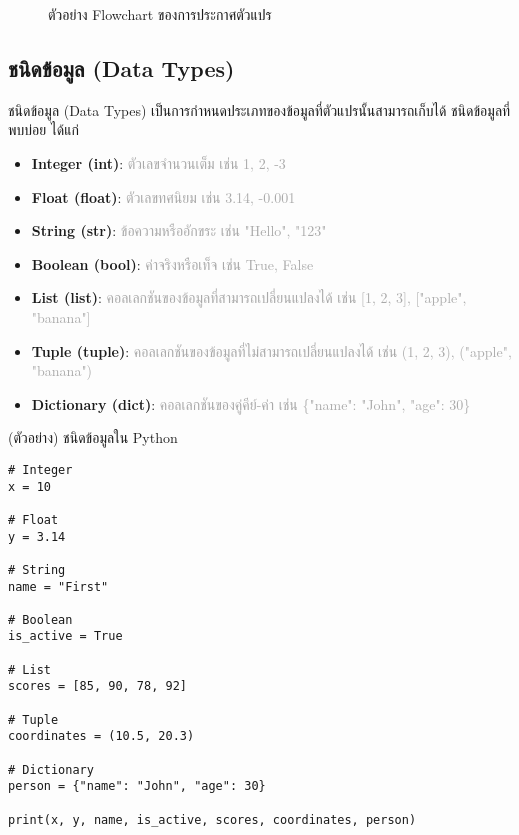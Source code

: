 \documentclass[12pt,a4paper]{article}
\newcommand{\textlight}[1]{{\thailightfont #1}}
\begin{document}
\vspace{0.1cm}

\begin{figure}[H]
\centering
{}
\caption{ตัวอย่าง Flowchart ของการประกาศตัวแปร}
\end{figure}

\subsection{ชนิดข้อมูล (Data Types)}

\textlight{ชนิดข้อมูล (Data Types) เป็นการกำหนดประเภทของข้อมูลที่ตัวแปรนั้นสามารถเก็บได้ ชนิดข้อมูลที่พบบ่อย ได้แก่}

\begin{itemize}
    \item \textbf{Integer (int)}: \textcolor{darkgray}{ตัวเลขจำนวนเต็ม เช่น 1, 2, -3}
    \item \textbf{Float (float)}: \textcolor{darkgray}{ตัวเลขทศนิยม เช่น 3.14, -0.001}
    \item \textbf{String (str)}: \textcolor{darkgray}{ข้อความหรืออักขระ เช่น "Hello", "123"}
    \item \textbf{Boolean (bool)}: \textcolor{darkgray}{ค่าจริงหรือเท็จ เช่น True, False}
    \item \textbf{List (list)}: \textcolor{darkgray}{คอลเลกชันของข้อมูลที่สามารถเปลี่ยนแปลงได้ เช่น [1, 2, 3], ["apple", "banana"]}
    \item \textbf{Tuple (tuple)}: \textcolor{darkgray}{คอลเลกชันของข้อมูลที่ไม่สามารถเปลี่ยนแปลงได้ เช่น (1, 2, 3), ("apple", "banana")}
    \item \textbf{Dictionary (dict)}: \textcolor{darkgray}{คอลเลกชันของคู่คีย์-ค่า เช่น \{"name": "John", "age": 30\}}
\end{itemize}

\begin{codebox}{(ตัวอย่าง) ชนิดข้อมูลใน Python}
\begin{lstlisting}[style=python]
# Integer
x = 10

# Float
y = 3.14

# String
name = "First"

# Boolean
is_active = True

# List
scores = [85, 90, 78, 92]

# Tuple
coordinates = (10.5, 20.3)

# Dictionary
person = {"name": "John", "age": 30}

print(x, y, name, is_active, scores, coordinates, person)
\end{lstlisting}
\end{codebox}
\end{document}
